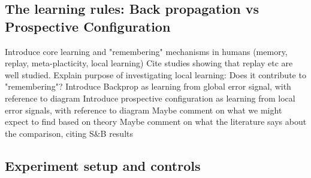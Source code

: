 \begin{figure}[t]\centering
  \begin{panelbox}
  \end{panelbox}
  \caption{\label{fig:901}}
\end{figure}

\subsection{The learning rules: Back propagation vs Prospective Configuration}
\label{sec:m2}

Introduce core learning and "remembering" mechanisms in humans (memory, replay, meta-placticity, local learning)
Cite studies showing that replay etc are well studied.
Explain purpose of investigating local learning: Does it contribute to "remembering"?
Introduce Backprop as learning from global error signal, with reference to diagram
Introduce prospective configuration as learning from local error signals, with reference to diagram
Maybe comment on what we might expect to find based on theory
Maybe comment on what the literature says about the comparison, citing S\&B results

\begin{figure}[t]\centering
  \begin{panelbox}
  \end{panelbox}
  \caption{\label{fig:rules_diagram}}
\end{figure}

\subsection{Experiment setup and controls}
\label{sec:m3}



